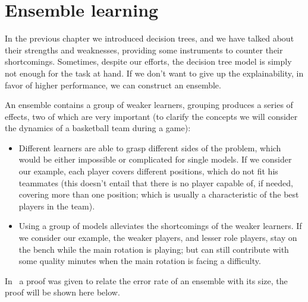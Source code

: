 \section{Ensemble learning}
\label{sec:el}
In the previous chapter we introduced decision trees, and we have talked about their
strengths and weaknesses, providing some instruments to counter their shortcomings. Sometimes,
despite our efforts, the decision tree model is simply not enough for the task at hand. If we don't
want to give up the explainability, in favor of higher performance, we can construct an ensemble.

\medskip

An ensemble contains a group of weaker learners, grouping produces a series of effects, two of which are
very important (to clarify the concepts we will consider the dynamics of a basketball team during a
game):
\begin{itemize}
	\item Different learners are able to grasp different sides of the problem, which would be
		either impossible or complicated for single models. If we consider our example, each
		player covers different positions, which do not fit his teammates (this doesn't
		entail that there is no player capable of, if needed, covering more than one
		position; which is usually a characteristic of the best players in the team).
	\item Using a group of models alleviates the shortcomings of the weaker learners. If we consider our example, the weaker players, and lesser role players, stay on the bench while the main rotation is playing; but can still contribute with some quality minutes when the main rotation is facing a difficulty.
\end{itemize}

In~\cite{ZhouZhi-Hua2021ML} a proof was given to relate the error rate of an ensemble with its size,
the proof will be shown here below.

\medskip

